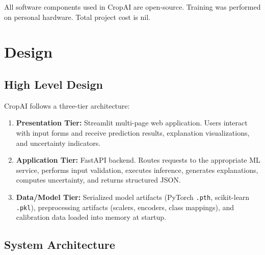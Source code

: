 \documentclass[12pt,a4paper]{report}
\begin{document}
All software components used in CropAI are open-source. Training was performed on personal hardware. Total project cost is nil.

\chapter{Design}

\section{High Level Design}
CropAI follows a three-tier architecture:
\begin{enumerate}[leftmargin=*]
  \item \textbf{Presentation Tier:} Streamlit multi-page web application. Users interact with input forms and receive prediction results, explanation visualizations, and uncertainty indicators.
  \item \textbf{Application Tier:} FastAPI backend. Routes requests to the appropriate ML service, performs input validation, executes inference, generates explanations, computes uncertainty, and returns structured JSON.
  \item \textbf{Data/Model Tier:} Serialized model artifacts (PyTorch \texttt{.pth}, scikit-learn \texttt{.pkl}), preprocessing artifacts (scalers, encoders, class mappings), and calibration data loaded into memory at startup.
\end{enumerate}

\section{System Architecture}
\end{document}
